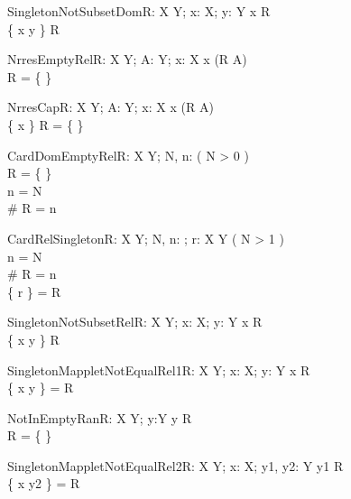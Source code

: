 \begin{theorem}{SingletonNotSubsetDom}{R: X \rel Y; x: X; y: Y}
x \notin \dom R \\
\dom \{ x \mapsto y \} \subset \dom R
\end{theorem}


\begin{theorem}{NrresEmptyRel}{R: X \rel Y; A: \power Y; x: X}
x \in \dom (R \nrres A) \\
R = \{ \}
\end{theorem}

\begin{theorem}{NrresCap}{R: X \rel Y; A: \power Y; x: X}
x \in \dom (R \nrres A) \\
\{ x \} \cap \dom R = \{ \}
\end{theorem}

\begin{theorem}{CardDomEmptyRel}{R: X \rel Y; \const N, n: \nat}
\eval( N > 0 ) \\
R = \{ \} \\
n = N \\
\# \dom R = n
\end{theorem}

\begin{theorem}{CardRelSingleton}{R: X \rel Y; \const N, n: \nat; r: X \cross Y}
\eval( N > 1 ) \\
n = N \\
\# \dom R = n \\
\{ r \} = R
\end{theorem}

\begin{theorem}{SingletonNotSubsetRel}{R: X \rel Y; x: X; y: Y}
x \notin \dom R \\
\{ x \mapsto y \} \subset R
\end{theorem}

\begin{theorem}{SingletonMappletNotEqualRel1}{R: X \rel Y; x: X; y: Y}
x \notin \dom R \\
\{ x \mapsto y \} = R
\end{theorem}

\begin{theorem}{NotInEmptyRan}{R: X \rel Y; y:Y}
y \in \ran R \\
R = \{ \}
\end{theorem}

\begin{theorem}{SingletonMappletNotEqualRel2}{R: X \rel Y; x: X; \const y1, \const y2: Y}
y1 \in \ran R \\
\{ x \mapsto y2 \} = R
\end{theorem}

